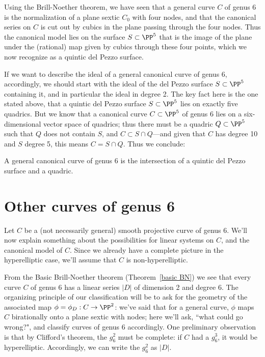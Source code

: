 Using the Brill-Noether theorem, we have seen that a general curve $C$ of genus 6 is the normalization of a plane sextic $C_0$ with four nodes, and that the canonical series on $C$ is cut out by cubics in the plane passing through the four nodes. Thus the canonical model lies on the surface $S \subset \PP^5$ that is the image of the plane under the (rational) map given by cubics through these four points, which we now recognize as a quintic del Pezzo surface.


If we want to describe the ideal of a general canonical curve of genus 6, accordingly, we should start with the ideal of the del Pezzo surface $S \subset \PP^5$ containing it, and in particular the ideal in degree 2. The key fact here is the one stated above, that a quintic del Pezzo surface $S \subset \PP^5$ lies on exactly five quadrics. But we know that a canonical curve $C \subset \PP^5$ of genus 6 lies on a six-dimensional vector space of quadrics; thus there must be a quadric $Q \subset \PP^5$ such that $Q$ does not contain $S$, and $C \subset S \cap Q$---and given that $C$ has degree 10 and $S$ degree 5, this means $C = S \cap Q$. Thus we conclude:

\begin{theorem}
A general canonical curve of genus 6 is the intersection of a quintic del Pezzo surface and a quadric. 
\end{theorem}

\section{Other curves of genus 6}

Let $C$ be a (not necessarily general) smooth projective curve of genus 6. We'll now explain something about the possibilities for  linear systems on $C$, and the canonical model of $C$. Since we already have a complete picture in the hyperelliptic case, we'll assume that $C$ is non-hyperelliptic.

From the Basic Brill-Noether theorem (Theorem~\ref{basic BN}) we see that every curve $C$ of genus 6 has a linear series $|D|$ of dimension 2
and degree 6. The organizing principle of our classification will be to ask for the geometry of the associated map $\phi = \phi_D : C \to \PP^2$: we've said that for a general curve,  $\phi$ maps $C$ birationally onto a plane sextic with nodes; here we'll ask, ``what could go wrong?", and classify curves of genus 6 accordingly. One preliminary observation is that by Clifford's theorem, the $g^2_6$ must be complete:  if $C$ had a $g^3_6$, it would be hyperelliptic. Accordingly, we can write the $g^2_6$ as $|D|$.

